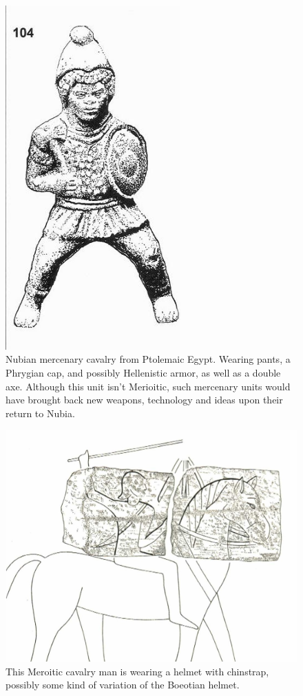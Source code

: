\documentclass[a4paper,12pt]{scrreprt}
\begin{document}
\begin{figure}[H]
	\centering
	\includegraphics[width=0.6\textwidth]{img/ptolemaic_egypt_mercenary}
	\caption{Nubian mercenary cavalry from Ptolemaic Egypt. Wearing pants, a Phrygian cap, and possibly Hellenistic armor, as well as a double axe. Although this unit isn't Merioitic, such mercenary units would have brought back new weapons, technology and ideas upon their return to Nubia.}
\end{figure}

\begin{figure}[H]
	\centering
	\includegraphics[width=\textwidth]{img/kushite_cavalry/meroitic_cavalry_man}
	\caption{This Meroitic cavalry man is wearing a helmet with chinstrap, possibly some kind of variation of the Boeotian helmet.}
\end{figure}
\end{document}
